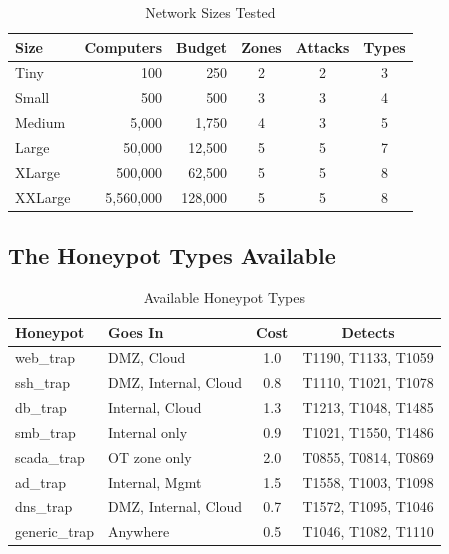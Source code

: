 \documentclass[journal]{IEEEtran}
\begin{document}
\begin{table}[htbp]
\caption{Network Sizes Tested}
\label{tab:scales}
\centering
\renewcommand{\arraystretch}{1.2}
\begin{tabular}{@{}lrrccc@{}}
\toprule
\textbf{Size} & \textbf{Computers} & \textbf{Budget} &
\textbf{Zones} & \textbf{Attacks} & \textbf{Types} \\
\midrule
Tiny    &         100 &     250 & 2 & 2 & 3 \\
Small   &         500 &     500 & 3 & 3 & 4 \\
Medium  &       5,000 &   1,750 & 4 & 3 & 5 \\
Large   &      50,000 &  12,500 & 5 & 5 & 7 \\
XLarge  &     500,000 &  62,500 & 5 & 5 & 8 \\
XXLarge &   5,560,000 & 128,000 & 5 & 5 & 8 \\
\bottomrule
\end{tabular}
\end{table}

\subsection{The Honeypot Types Available}

\begin{table}[htbp]
\caption{Available Honeypot Types}
\label{tab:profiles}
\centering
\renewcommand{\arraystretch}{1.2}
\begin{tabular}{@{}llcc@{}}
\toprule
\textbf{Honeypot} & \textbf{Goes In} & \textbf{Cost} &
\textbf{Detects} \\
\midrule
web\_trap     & DMZ, Cloud          & 1.0 & T1190, T1133, T1059 \\
ssh\_trap     & DMZ, Internal, Cloud& 0.8 & T1110, T1021, T1078 \\
db\_trap      & Internal, Cloud     & 1.3 & T1213, T1048, T1485 \\
smb\_trap     & Internal only       & 0.9 & T1021, T1550, T1486 \\
scada\_trap   & OT zone only        & 2.0 & T0855, T0814, T0869 \\
ad\_trap      & Internal, Mgmt      & 1.5 & T1558, T1003, T1098 \\
dns\_trap     & DMZ, Internal, Cloud& 0.7 & T1572, T1095, T1046 \\
generic\_trap & Anywhere            & 0.5 & T1046, T1082, T1110 \\
\bottomrule
\end{tabular}
\end{table}
\end{document}

